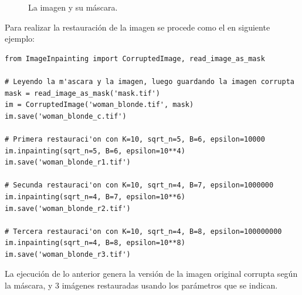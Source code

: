 \begin{figure}[H]
	\caption{La imagen y su m\'ascara.}
	\label{fig:woman_blonde}
\end{figure}
Para realizar la restauraci\'on de la imagen se procede como el en siguiente ejemplo:
\begin{lstlisting}
from ImageInpainting import CorruptedImage, read_image_as_mask

# Leyendo la m'ascara y la imagen, luego guardando la imagen corrupta
mask = read_image_as_mask('mask.tif')
im = CorruptedImage('woman_blonde.tif', mask)
im.save('woman_blonde_c.tif')

# Primera restauraci'on con K=10, sqrt_n=5, B=6, epsilon=10000 
im.inpainting(sqrt_n=5, B=6, epsilon=10**4)
im.save('woman_blonde_r1.tif')

# Secunda restauraci'on con K=10, sqrt_n=4, B=7, epsilon=1000000
im.inpainting(sqrt_n=4, B=7, epsilon=10**6)
im.save('woman_blonde_r2.tif')

# Tercera restauraci'on con K=10, sqrt_n=4, B=8, epsilon=100000000 
im.inpainting(sqrt_n=4, B=8, epsilon=10**8)
im.save('woman_blonde_r3.tif')
\end{lstlisting}
La ejecuci\'on de lo anterior genera la versi\'on de la imagen original corrupta seg\'un la m\'ascara, y 3 im\'agenes restauradas usando los par\'ametros que se indican.
